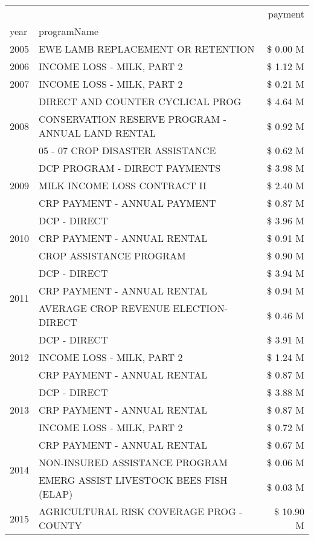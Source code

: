 \begin{tabular}{llr}
\toprule
 &  & payment \\
year & programName &  \\
\midrule
2005 & EWE LAMB REPLACEMENT OR RETENTION & \$ 0.00 M \\
\cline{1-3}
2006 & INCOME LOSS - MILK, PART 2 & \$ 1.12 M \\
\cline{1-3}
2007 & INCOME LOSS - MILK, PART 2 & \$ 0.21 M \\
\cline{1-3}
\multirow[t]{3}{*}{2008} & DIRECT AND COUNTER CYCLICAL PROG & \$ 4.64 M \\
 & CONSERVATION RESERVE PROGRAM - ANNUAL LAND RENTAL & \$ 0.92 M \\
 & 05 - 07 CROP DISASTER ASSISTANCE & \$ 0.62 M \\
\cline{1-3}
\multirow[t]{3}{*}{2009} & DCP PROGRAM - DIRECT PAYMENTS & \$ 3.98 M \\
 & MILK INCOME LOSS CONTRACT II & \$ 2.40 M \\
 & CRP PAYMENT - ANNUAL PAYMENT & \$ 0.87 M \\
\cline{1-3}
\multirow[t]{3}{*}{2010} & DCP - DIRECT & \$ 3.96 M \\
 & CRP PAYMENT - ANNUAL RENTAL & \$ 0.91 M \\
 & CROP ASSISTANCE PROGRAM & \$ 0.90 M \\
\cline{1-3}
\multirow[t]{3}{*}{2011} & DCP - DIRECT & \$ 3.94 M \\
 & CRP PAYMENT - ANNUAL RENTAL & \$ 0.94 M \\
 & AVERAGE CROP REVENUE ELECTION-DIRECT & \$ 0.46 M \\
\cline{1-3}
\multirow[t]{3}{*}{2012} & DCP - DIRECT & \$ 3.91 M \\
 & INCOME LOSS - MILK, PART 2 & \$ 1.24 M \\
 & CRP PAYMENT - ANNUAL RENTAL & \$ 0.87 M \\
\cline{1-3}
\multirow[t]{3}{*}{2013} & DCP - DIRECT & \$ 3.88 M \\
 & CRP PAYMENT - ANNUAL RENTAL & \$ 0.87 M \\
 & INCOME LOSS - MILK, PART 2 & \$ 0.72 M \\
\cline{1-3}
\multirow[t]{3}{*}{2014} & CRP PAYMENT - ANNUAL RENTAL & \$ 0.67 M \\
 & NON-INSURED ASSISTANCE PROGRAM & \$ 0.06 M \\
 & EMERG ASSIST LIVESTOCK BEES FISH (ELAP) & \$ 0.03 M \\
\cline{1-3}
\multirow[t]{3}{*}{2015} & AGRICULTURAL RISK COVERAGE PROG - COUNTY & \$ 10.90 M \\

\end{tabular}
